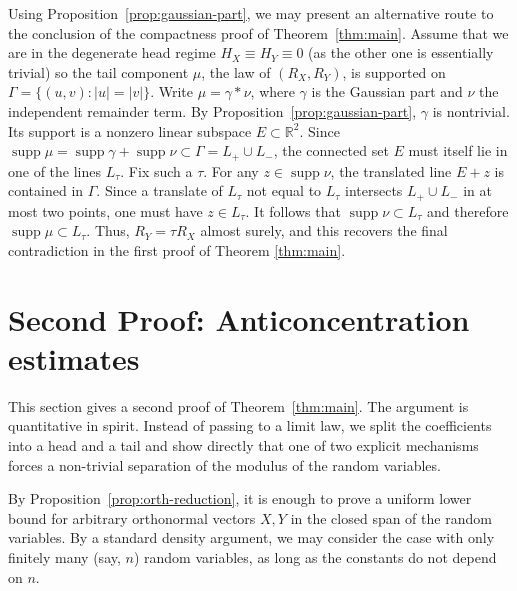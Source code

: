\documentclass[11pt]{amsart}
\numberwithin{equation}{section}
\theoremstyle{definition}
\theoremstyle{remark}
\newcommand{\R}{\mathbb R}
\newcommand{\supp}{\operatorname{supp}}
\newcommand{\abs}[1]{\lvert #1 \rvert}
\begin{document}
Using Proposition~\ref{prop:gaussian-part}, we may present an alternative route to the conclusion of the compactness proof of Theorem~\ref{thm:main}. Assume that we are in the degenerate head regime $H_X\equiv H_Y\equiv0$ (as the other one is essentially trivial) so the
tail component $\mu$, the law of $(R_X,R_Y)$, is supported on $\Gamma=\{(u,v):\abs{u}=\abs{v}\}$.
Write $\mu=\gamma*\nu$, where $\gamma$ is the Gaussian part and $\nu$ the
independent remainder term.  By Proposition~\ref{prop:gaussian-part}, $\gamma$ is
nontrivial.  Its support is a nonzero linear subspace $E\subset\R^2$.
Since $\supp\mu=\supp\gamma+\supp\nu\subset\Gamma=L_+\cup L_-$, the
connected set $E$ must itself lie in one of the lines $L_\tau$.  Fix such a
$\tau$.  For any $z\in\supp\nu$, the translated line $E+z$ is contained in
$\Gamma$.  Since a translate of $L_\tau$ not equal to $L_\tau$ intersects
$L_+\cup L_-$ in at most two points, one must have $z\in L_\tau$.  It follows that
$\supp\nu\subset L_\tau$ and therefore $\supp\mu\subset L_\tau$.  Thus,
$R_Y=\tau R_X$ almost surely, and this recovers the final contradiction in the first proof of Theorem \ref{thm:main}. 

\section{Second Proof: Anticoncentration estimates}\label{sec:quant-proof}

This section gives a second proof of Theorem~\ref{thm:main}.  The argument is
quantitative in spirit.  Instead of passing to a limit law, we split the
coefficients into a head and a tail and show directly that one of two explicit
mechanisms forces a non-trivial separation of the modulus of the random variables.

 By Proposition~\ref{prop:orth-reduction}, it is enough to prove a uniform
lower bound for arbitrary orthonormal vectors $X, Y$ in the closed span of the random variables. By a standard density argument, we may consider the case with only finitely many (say, $n$) random variables, as long as the constants do not depend on $n$.
\end{document}
